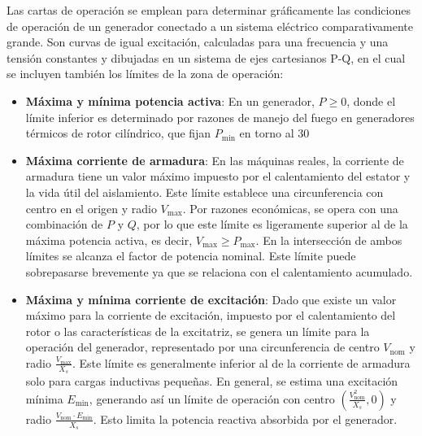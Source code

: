 \documentclass[
  11pt,
  letterpaper,
   addpoints,
   answers
  ]{exam}
\begin{document}
Las cartas de operación se emplean para determinar gráficamente las condiciones de operación de un generador conectado a un sistema eléctrico comparativamente grande. Son curvas de igual excitación, calculadas para una frecuencia y una tensión constantes y dibujadas en un sistema de ejes cartesianos P-Q, en el cual se incluyen también los límites de la zona de operación:

\begin{itemize}
    \item \textbf{Máxima y mínima potencia activa}: En un generador, \( P \geq 0 \), donde el límite inferior es determinado por razones de manejo del fuego en generadores térmicos de rotor cilíndrico, que fijan \( P_{\text{min}} \) en torno al 30%

    \item \textbf{Máxima corriente de armadura}: En las máquinas reales, la corriente de armadura tiene un valor máximo impuesto por el calentamiento del estator y la vida útil del aislamiento. Este límite establece una circunferencia con centro en el origen y radio \( V_{\text{max}} \). Por razones económicas, se opera con una combinación de \( P \) y \( Q \), por lo que este límite es ligeramente superior al de la máxima potencia activa, es decir, \( V_{\text{max}} \geq P_{\text{max}} \). En la intersección de ambos límites se alcanza el factor de potencia nominal. Este límite puede sobrepasarse brevemente ya que se relaciona con el calentamiento acumulado.

    \item \textbf{Máxima y mínima corriente de excitación}: Dado que existe un valor máximo para la corriente de excitación, impuesto por el calentamiento del rotor o las características de la excitatriz, se genera un límite para la operación del generador, representado por una circunferencia de centro \( V_{\text{nom}} \) y radio \( \frac{V_{\text{max}}}{X_s} \). Este límite es generalmente inferior al de la corriente de armadura solo para cargas inductivas pequeñas. En general, se estima una excitación mínima \( E_{\text{min}} \), generando así un límite de operación con centro \( \left( \frac{V_{\text{nom}}^2}{X_s}, 0 \right) \) y radio \( \frac{V_{\text{nom}} \cdot E_{\text{min}}}{X_s} \). Esto limita la potencia reactiva absorbida por el generador.


\end{itemize}
\end{document}
